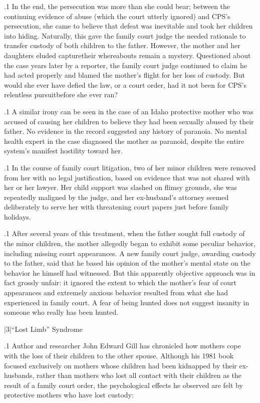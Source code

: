 \documentclass[11pt, twoside]{article}
\begin{document}
{\p.1{%
In the end, the persecution was more than she could bear; between
the continuing evidence of abuse (which the court utterly ignored) and
CPS’s persecution, she came to believe that defeat was inevitable and
took her children into hiding. Naturally, this gave the family court judge
the needed rationale to transfer custody of both children to the father.
However, the mother and her daughters eluded capture\mdash{}their whereabouts remain a mystery. Questioned about the case years later by a
reporter, the family court judge continued to claim he had acted properly and blamed the mother’s flight for her loss of custody. But would
she ever have defied the law, or a court order, had it not been for CPS’s
relentless pursuit\mdash{}before she ever ran?
}%

\p.1{%
A similar irony can be seen in the case of an Idaho protective mother
who was accused of causing her children to believe they had been sexually abused by their father. No evidence in the record suggested any
history of paranoia. No mental health expert in the case diagnosed the
mother as paranoid, despite the entire system’s manifest hostility toward
her.
}%

\p.1{%
In the course of family court litigation, two of her minor children
were removed from her with no legal justification, based on evidence
that was not shared with her or her lawyer. Her child support was slashed
on flimsy grounds, she was repeatedly maligned by the judge, and her
ex-husband’s attorney seemed deliberately to serve her with threatening
court papers just before family holidays.
}%

\p.1{%
After several years of this treatment, when the father sought full custody of the minor children, the mother allegedly began to exhibit some
peculiar behavior, including missing court appearances. A new family court judge, awarding custody to the father, said that he based his
opinion of the mother’s mental state on the behavior he himself had
witnessed. But this apparently objective approach was in fact grossly
unfair: it ignored the extent to which the mother’s fear of court appearances and extremely anxious behavior resulted from what she had
experienced in family court. A fear of being hunted does not suggest
insanity in someone who really has been hunted.
}%


\s|3|{``Lost Limb'' Syndrome}

\p.1{%
\noindent{}Author and researcher John Edward Gill has chronicled how mothers cope with the loss of their children to the other spouse. Although
his 1981 book focused exclusively on mothers whose children had
been kidnapped by their ex-husbands, rather than mothers who lost all
contact with their children as the result of a family court order, the psychological effects he observed are felt by protective mothers who have
lost custody: 
}%

}
\end{document}
